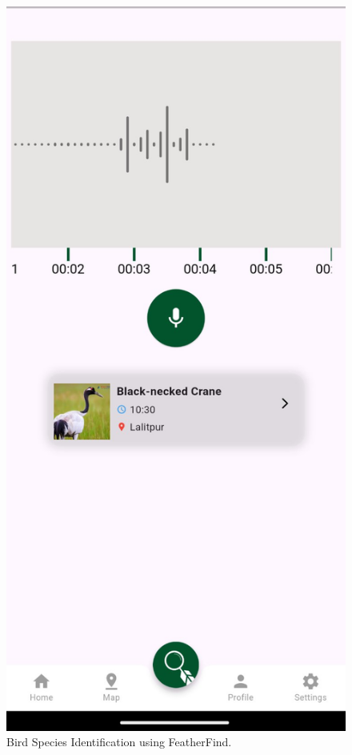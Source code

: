\begin{figure}[h!]
    \centering
    \includegraphics[scale=0.4]{images/Identified.jpg}
    \caption{Bird Species Identification using FeatherFind.}
\end{figure}


